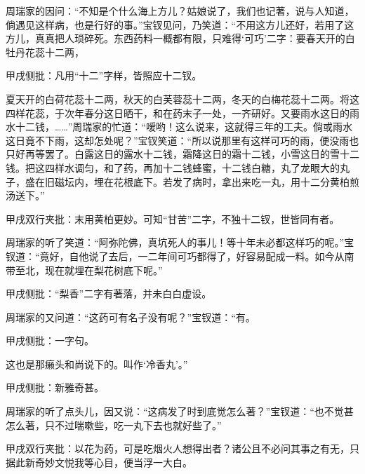\begin{parag}


    周瑞家的因问：“不知是个什么海上方儿？姑娘说了，我们也记著，说与人知道，倘遇见这样病，也是行好的事。”宝钗见问，乃笑道：“不用这方儿还好，若用了这方儿，真真把人琐碎死。东西药料一概都有限，只难得‘可巧’二字：要春天开的白牡丹花蕊十二两，\begin{note}甲戌侧批：凡用“十二”字样，皆照应十二钗。\end{note}夏天开的白荷花蕊十二两，秋天的白芙蓉蕊十二两，冬天的白梅花蕊十二两。将这四样花蕊，于次年春分这日晒干，和在药末子一处，一齐研好。又要雨水这日的雨水十二钱，……”周瑞家的忙道：“嗳哟！这么说来，这就得三年的工夫。倘或雨水这日竟不下雨，这却怎处呢？”宝钗笑道：“所以说那里有这样可巧的雨，便没雨也只好再等罢了。白露这日的露水十二钱，霜降这日的霜十二钱，小雪这日的雪十二钱。把这四样水调匀，和了药，再加十二钱蜂蜜，十二钱白糖，丸了龙眼大的丸子，盛在旧磁坛内，埋在花根底下。若发了病时，拿出来吃一丸，用十二分黄柏煎汤送下。”\begin{note}甲戌双行夹批：末用黄柏更妙。可知“甘苦”二字，不独十二钗，世皆同有者。\end{note}
\end{parag}


\begin{parag}


    周瑞家的听了笑道：“阿弥陀佛，真坑死人的事儿！等十年未必都这样巧的呢。”宝钗道：“竟好，自他说了去后，一二年间可巧都得了，好容易配成一料。如今从南带至北，现在就埋在梨花树底下呢。”\begin{note}甲戌侧批：“梨香”二字有著落，并未白白虚设。\end{note}周瑞家的又问道：“这药可有名子没有呢？”宝钗道：“有。\begin{note}甲戌侧批：一字句。\end{note}这也是那癞头和尚说下的。叫作‘冷香丸’。”\begin{note}甲戌侧批：新雅奇甚。\end{note}周瑞家的听了点头儿，因又说：“这病发了时到底觉怎么著？”宝钗道：“也不觉甚怎么著，只不过喘嗽些，吃一丸下去也就好些了。”\begin{note}甲戌双行夹批：以花为药，可是吃烟火人想得出者？诸公且不必问其事之有无，只据此新奇妙文悦我等心目，便当浮一大白。\end{note}
\end{parag}


